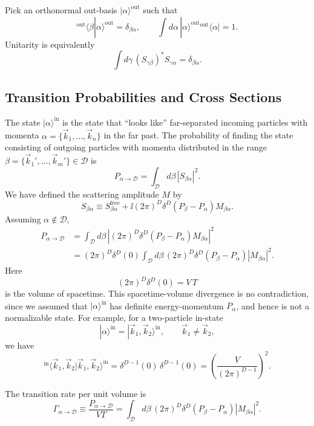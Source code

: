 Pick an orthonormal out-basis \(|\alpha\rangle^{\mathrm{out}}\) such that
\[
  {}^{\mathrm{out}}\langle\beta|\alpha\rangle^{\mathrm{out}}
  =
  \delta_{\beta\alpha},
  \qquad
  \int d\alpha\,
  |\alpha\rangle^{\mathrm{out}}{}^{\mathrm{out}}\langle\alpha|
  =
  1 .
\]
Unitarity is equivalently
\[
  \int d\gamma\, (S_{\gamma\beta})^*S_{\gamma\alpha}
  =
  \delta_{\beta\alpha}.
\]

\subsection*{Transition Probabilities and Cross Sections}

The state \(|\alpha\rangle^{\mathrm{in}}\) is the state that ``looks like''
far-separated incoming particles with momenta
\(\alpha=\{\vec k_1,\ldots,\vec k_n\}\) in the far past. The probability of
finding the state consisting of outgoing particles with momenta distributed in
the range \(\beta=\{\vec k_1',\ldots,\vec k_m'\}\in\mathcal D\) is
\[
  P_{\alpha\to\mathcal D}
  =
  \int_{\mathcal D}d\beta\, |S_{\beta\alpha}|^2.
\]
We have defined the scattering amplitude \(M\) by
\[
  S_{\beta\alpha}
  \equiv
  S^{\mathrm{free}}_{\beta\alpha}
  +\ii(2\pi)^D\delta^D(P_\beta-P_\alpha)M_{\beta\alpha}.
\]
Assuming \(\alpha\notin\mathcal D\),
\[
\begin{aligned}
P_{\alpha\to\mathcal D}
&=
\int_{\mathcal D}d\beta\,
\left|(2\pi)^D\delta^D(P_\beta-P_\alpha)M_{\beta\alpha}\right|^2
\\
&=
(2\pi)^D\delta^D(0)
\int_{\mathcal D}d\beta\,
(2\pi)^D\delta^D(P_\beta-P_\alpha)|M_{\beta\alpha}|^2 .
\end{aligned}
\]
Here
\[
  (2\pi)^D\delta^D(0)=V\,T
\]
is the volume of spacetime. This spacetime-volume divergence is no
contradiction, since we assumed that \(|\alpha\rangle^{\mathrm{in}}\) has
definite energy-momentum \(P_\alpha\), and hence is not a normalizable state.
For example, for a two-particle in-state
\[
  |\alpha\rangle^{\mathrm{in}}
  =
  |\vec k_1,\vec k_2\rangle^{\mathrm{in}},
  \qquad
  \vec k_1\ne \vec k_2,
\]
we have
\[
  {}^{\mathrm{in}}\langle \vec k_1,\vec k_2
  |\vec k_1,\vec k_2\rangle^{\mathrm{in}}
  =
  \delta^{D-1}(0)\,\delta^{D-1}(0)
  =
  \left(\frac{V}{(2\pi)^{D-1}}\right)^2.
\]

The transition rate per unit volume is
\[
  \Gamma_{\alpha\to\mathcal D}
  \equiv
  \frac{P_{\alpha\to\mathcal D}}{VT}
  =
  \int_{\mathcal D}d\beta\,
  (2\pi)^D\delta^D(P_\beta-P_\alpha)|M_{\beta\alpha}|^2 .
\]

